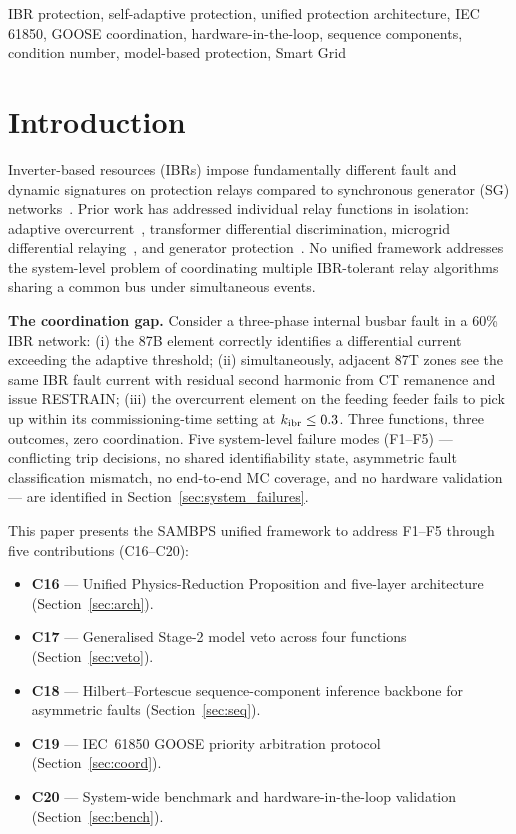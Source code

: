 \documentclass[journal,twoside]{IEEEtran}
\begin{document}
\begin{IEEEkeywords}
IBR protection, self-adaptive protection, unified protection architecture,
IEC 61850, GOOSE coordination, hardware-in-the-loop, sequence components,
condition number, model-based protection, Smart Grid
\end{IEEEkeywords}

\section{Introduction}
\label{sec:intro}

Inverter-based resources (IBRs) impose fundamentally different fault and dynamic
signatures on protection relays compared to synchronous generator (SG)
networks~\cite{Telukunta2017,Hooshyar2017,Plet2011}.
Prior work has addressed individual relay functions in isolation: adaptive
overcurrent~\cite{Ojaghi2015}, transformer differential discrimination,
microgrid differential relaying~\cite{Nikkhajoei2009}, and generator
protection~\cite{Hooshyar2017}.
No unified framework addresses the system-level problem of coordinating multiple
IBR-tolerant relay algorithms sharing a common bus under simultaneous events.

\textbf{The coordination gap.}
Consider a three-phase internal busbar fault in a 60\% IBR network:
(i) the 87B element correctly identifies a differential current exceeding the
adaptive threshold;
(ii) simultaneously, adjacent 87T zones see the same IBR fault current with
residual second harmonic from CT remanence and issue RESTRAIN;
(iii) the overcurrent element on the feeding feeder fails to pick up within its
commissioning-time setting at $k_{\rm ibr} \leq 0.3$.
Three functions, three outcomes, zero coordination.
Five system-level failure modes (F1--F5) --- conflicting trip decisions, no
shared identifiability state, asymmetric fault classification mismatch, no
end-to-end MC coverage, and no hardware validation --- are identified in
Section~\ref{sec:system_failures}.

This paper presents the SAMBPS unified framework to address F1--F5 through five
contributions (C16--C20):
\begin{itemize}
  \item \textbf{C16} --- Unified Physics-Reduction Proposition and five-layer
        architecture (Section~\ref{sec:arch}).
  \item \textbf{C17} --- Generalised Stage-2 model veto across four functions
        (Section~\ref{sec:veto}).
  \item \textbf{C18} --- Hilbert--Fortescue sequence-component inference
        backbone for asymmetric faults (Section~\ref{sec:seq}).
  \item \textbf{C19} --- IEC~61850 GOOSE priority arbitration protocol
        (Section~\ref{sec:coord}).
  \item \textbf{C20} --- System-wide benchmark and hardware-in-the-loop
        validation (Section~\ref{sec:bench}).
\end{itemize}
\end{document}
